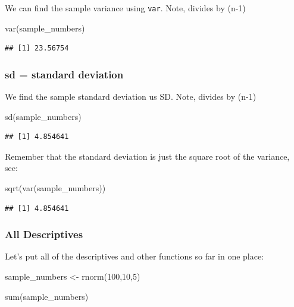 \documentclass[
]{book}
\newenvironment{Shaded}{\begin{snugshade}}{\end{snugshade}}
\newcommand{\DecValTok}[1]{\textcolor[rgb]{0.00,0.00,0.81}{#1}}
\newcommand{\FunctionTok}[1]{\textcolor[rgb]{0.00,0.00,0.00}{#1}}
\newcommand{\NormalTok}[1]{#1}
\newcommand{\OtherTok}[1]{\textcolor[rgb]{0.56,0.35,0.01}{#1}}
\begin{document}
We can find the sample variance using \texttt{var}. Note, divides by (n-1)

\begin{Shaded}
\begin{Highlighting}[]
\FunctionTok{var}\NormalTok{(sample\_numbers)}
\end{Highlighting}
\end{Shaded}

\begin{verbatim}
## [1] 23.56754
\end{verbatim}

\hypertarget{sd-standard-deviation}{%
\subsubsection{sd = standard deviation}\label{sd-standard-deviation}}

We find the sample standard deviation us SD. Note, divides by (n-1)

\begin{Shaded}
\begin{Highlighting}[]
\FunctionTok{sd}\NormalTok{(sample\_numbers)}
\end{Highlighting}
\end{Shaded}

\begin{verbatim}
## [1] 4.854641
\end{verbatim}

Remember that the standard deviation is just the square root of the variance, see:

\begin{Shaded}
\begin{Highlighting}[]
\FunctionTok{sqrt}\NormalTok{(}\FunctionTok{var}\NormalTok{(sample\_numbers))}
\end{Highlighting}
\end{Shaded}

\begin{verbatim}
## [1] 4.854641
\end{verbatim}

\hypertarget{all-descriptives}{%
\subsubsection{All Descriptives}\label{all-descriptives}}

Let's put all of the descriptives and other functions so far in one place:

\begin{Shaded}
\begin{Highlighting}[]
\NormalTok{sample\_numbers }\OtherTok{\textless{}{-}} \FunctionTok{rnorm}\NormalTok{(}\DecValTok{100}\NormalTok{,}\DecValTok{10}\NormalTok{,}\DecValTok{5}\NormalTok{)}

\FunctionTok{sum}\NormalTok{(sample\_numbers)}
\end{Highlighting}
\end{Shaded}
\end{document}
